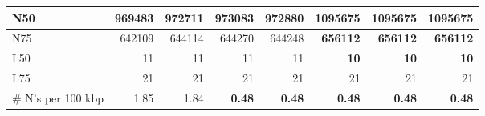 \documentclass[12pt,a4paper]{article}
\begin{document}
\begin{table}[ht]
\begin{center}
\begin{tabular}{|l*{7}{|r}|}
N50 & 969483 & 972711 & 973083 & 972880 & {\bf 1095675} & {\bf 1095675} & {\bf 1095675} \\ \hline
N75 & 642109 & 644114 & 644270 & 644248 & {\bf 656112} & {\bf 656112} & {\bf 656112} \\ \hline
L50 & 11 & 11 & 11 & 11 & {\bf 10} & {\bf 10} & {\bf 10} \\ \hline
L75 & 21 & 21 & 21 & 21 & 21 & 21 & 21 \\ \hline
\# N's per 100 kbp & 1.85 & 1.84 & {\bf 0.48} & {\bf 0.48} & {\bf 0.48} & {\bf 0.48} & {\bf 0.48} \\ \hline
\end{tabular}
\end{center}
\end{table}
\end{document}
